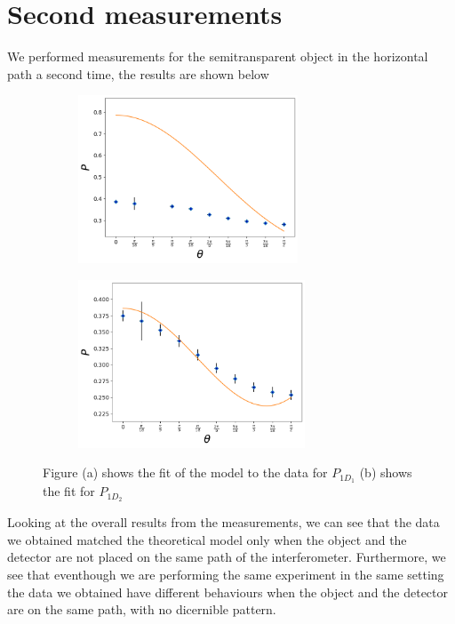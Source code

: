 \documentclass[12pt]{book}
\begin{document}
\section{Second measurements}


We performed measurements for the semitransparent object in the horizontal path a second time, the results are shown below

\begin{figure}[t!]
\centering
\begin{subfigure}[b]{0.45\linewidth}
\includegraphics[width=\linewidth,height=5cm]{images/ajuste_jueves_11_50:50.png}
\caption{}
\end{subfigure}
\begin{subfigure}[b]{0.45\linewidth}
\includegraphics[width=\linewidth,height=5cm]{images/ajuste_jueves_21_50:50.png}
\caption{}
\end{subfigure}
\caption{Figure (a) shows the fit of the model to the data for $P_{1D_{1}}$ (b) shows the fit for $P_{1D_{2}}$}
\label{fig:segunda}
\end{figure}


Looking at the overall results from the measurements, we can see that the data we obtained matched the theoretical model only when the object and the detector are not placed on the same path of the interferometer. Furthermore, we see that eventhough we are performing the same experiment in the same setting the data we obtained have different behaviours when the object and the detector are on the same path, with no dicernible pattern. 
\end{document}

